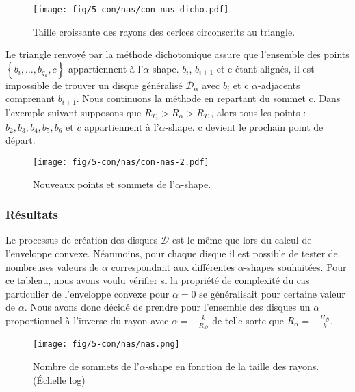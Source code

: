 \begin{figure}[H]
  \centering
  \texttt{[image: fig/5-con/nas/con-nas-dicho.pdf]}
  \caption{Taille croissante des rayons des cerlces circonscrits au triangle.}
  \label{fig:nas-dicho}
\end{figure}

Le triangle renvoyé par la méthode dichotomique assure que l'ensemble des points $\left\{ b_{i}, \ldots, b_{q_k}, c \right\}$ appartiennent à l'$\alpha$-shape. $b_{i}$, $b_{i+1}$ et c étant alignés, il est impossible de trouver un disque généralisé $\mathcal{D}_{\alpha}$ avec $b_{i}$ et c $\alpha$-adjacents comprenant $b_{i+1}$. Nous continuons la méthode en repartant du sommet c. Dans l'exemple suivant supposons que $R_{T_{2}} > R_{\alpha} >  R_{T_{1}}$, alors tous les points : $b_{2}, b_{3}, b_{4}, b_{5}, b_{6}$ et $c$ appartiennent à l'$\alpha$-shape. c devient le prochain point de départ.
 
\begin{figure}[H]
  \centering
  \texttt{[image: fig/5-con/nas/con-nas-2.pdf]}
  \caption{Nouveaux points et sommets de l'$\alpha$-shape.}
\end{figure}


\subsubsection{Résultats}

Le processus de création des disques $\mathcal{D}$ est le même que lors du calcul de l'enveloppe convexe. Néanmoins, pour chaque disque il est possible de tester de nombreuses valeurs de $\alpha$ correspondant aux différentes $\alpha$-shapes souhaitées. Pour ce tableau, nous avons voulu vérifier si la propriété de complexité du cas particulier de l'enveloppe convexe pour $\alpha = 0$ se généralisait pour certaine valeur de $\alpha$. Nous avons donc décidé de prendre pour l'ensemble des disques un $\alpha$ proportionnel à l'inverse du rayon avec $\alpha = -\frac{k}{R_{\mathcal{D}}}$ de telle sorte que $R_{\alpha} = -\frac{R_{\mathcal{D}}}{k}$.
 

\begin{figure}[H]
  \centering
  \texttt{[image: fig/5-con/nas/nas.png]}
  \caption{Nombre de sommets de l'$\alpha$-shape en fonction de la taille des rayons. (Échelle log)}
\end{figure}


